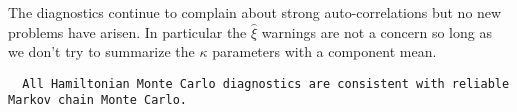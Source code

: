 \documentclass[
  letterpaper,
  DIV=11,
  numbers=noendperiod]{scrartcl}
\newenvironment{Shaded}{\begin{snugshade}}{\end{snugshade}}
\newcommand{\AttributeTok}[1]{\textcolor[rgb]{0.40,0.45,0.13}{#1}}
\newcommand{\ConstantTok}[1]{\textcolor[rgb]{0.56,0.35,0.01}{#1}}
\newcommand{\FunctionTok}[1]{\textcolor[rgb]{0.28,0.35,0.67}{#1}}
\newcommand{\NormalTok}[1]{\textcolor[rgb]{0.00,0.23,0.31}{#1}}
\newcommand{\OtherTok}[1]{\textcolor[rgb]{0.00,0.23,0.31}{#1}}
\newcommand{\SpecialCharTok}[1]{\textcolor[rgb]{0.37,0.37,0.37}{#1}}
\newcommand{\StringTok}[1]{\textcolor[rgb]{0.13,0.47,0.30}{#1}}
\begin{document}
The diagnostics continue to complain about strong auto-correlations but
no new problems have arisen. In particular the \(\hat{\xi}\) warnings
are not a concern so long as we don't try to summarize the \(\kappa\)
parameters with a component mean.

\begin{Shaded}
\end{Shaded}

\begin{verbatim}
  All Hamiltonian Monte Carlo diagnostics are consistent with reliable
Markov chain Monte Carlo.
\end{verbatim}

\begin{Shaded}
\end{Shaded}
\end{document}
